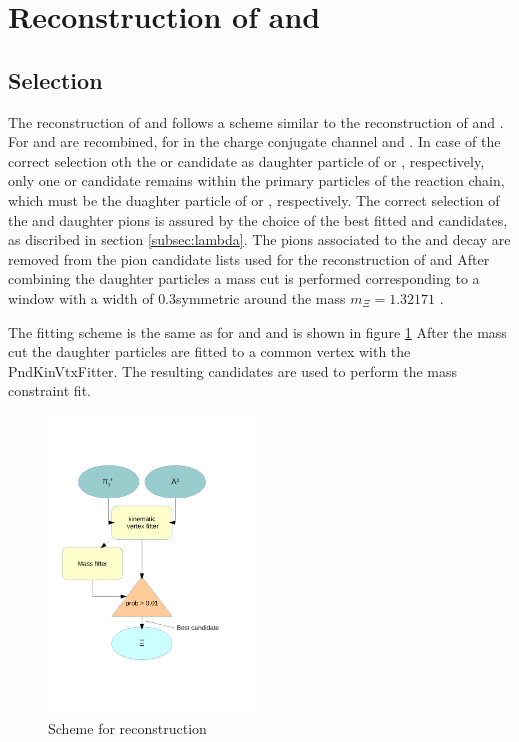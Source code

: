 		
		
		
	
\section{Reconstruction of \cascade and \anticascade}
	\subsection*{Selection}
		The reconstruction of \cascade and \anticascade follows a scheme similar to the reconstruction of \lam and \alam.
		For \anticascade \alam and \piplus are recombined, for \cascade in the charge conjugate channel \lam and \piminus.
		In case of the correct selection oth the \piminus or \piplus candidate as daughter particle of \lam or \alam, respectively,
		only one \piminus or \piplus candidate remains within the primary particles of the reaction chain, which must be the duaghter 
		particle of \cascade or \anticascade, respectively.
		The correct selection of the \lam and \alam daughter pions is assured by the choice of the best fitted \lam and \alam candidates, 
		as discribed in section \ref{subsec:lambda}.
		The pions associated to the \lam and \alam decay are removed from the pion candidate lists used for the reconstruction of \cascade and \anticascade
		After combining the daughter particles a mass cut is performed corresponding to a window with a width of $0.3$\massunit symmetric around 
		the \cascade mass $m_{\Xi} = 1.32171$ \massunit \cite{PDG}.
		 
		The fitting scheme is the same as for \lam and \alam and is shown in figure \ref{fig:anticascade_scheme} 
		After the mass cut the daughter particles are fitted to a common vertex with the PndKinVtxFitter.
		The resulting candidates are used to perform the mass constraint fit. 
		
		\begin{figure}
			\centering
				\includegraphics[width=0.50\textwidth]{./plots/combineAntiCascade.pdf}
			\caption{\propose Scheme for \anticascade reconstruction}
			\label{fig:anticascade_scheme}
		\end{figure}
		
